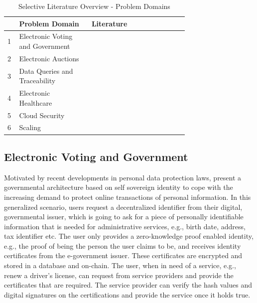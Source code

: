 \setlength{\tabcolsep}{2ex}
\renewcommand{\arraystretch}{1.5}%
\begin{table}[ht]
	\centering
	    \caption{Selective Literature Overview - Problem Domains}
		\begin{tabular}{| m{0.02\linewidth} | m{0.3\linewidth} | m{0.4\linewidth} |}
		\hline
		\textbf{} & \textbf{Problem Domain} & \textbf{Literature} \\ \hline
            1 & Electronic Voting and \newline Government & \citet{Bansod, Guo, Querejeta} \\  \hline
            2 & Electronic Auctions & \citet{LiXue, WangZhaoMu} \\ \hline 
            3 & Data Queries and \newline Traceability & \citet{Godden, XueWang}  \\  \hline
            4 & Electronic Healthcare & \citet{LuongPark, ZHENG, WangEtAl, Huangetal} \\  \hline 
            5 & Cloud Security & \citet{LiuWangPengXing, Major, Munivel, Kanagamani} \\  \hline 
            6 & Scaling &  \\  \hline 
	\end{tabular}
\label{tab:domains}
\end{table}

\subsection{Electronic Voting and Government}
Motivated by recent developments in personal data protection laws, \citet{Bansod} present a governmental architecture based on self sovereign identity to cope with the increasing demand to protect online transactions of personal information. In this generalized scenario, users request a decentralized identifier from their digital, governmental issuer, which is going to ask for a piece of personally identifiable information that is needed for administrative services, e.g., birth date, address, tax identifier etc. The user only provides a zero-knowledge proof enabled identity, e.g., the proof of being the person the user claims to be, and receives identity certificates from the e-government issuer. These certificates are encrypted and stored in a database and on-chain. The user, when in need of a service, e.g., renew a driver's license, can request from service providers and provide the certificates that are required. The service provider can verify the hash values and digital signatures on the certifications and provide the service once it holds true.

